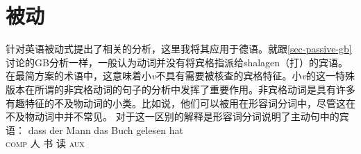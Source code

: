\section{被动}

\addlines
\citet{Adger2003a}针对英语被动式提出了相关的分析，这里我将其应用于德语。就跟\ref{sec-passive-gb}讨论的GB分析一样，一般认为动词并没有将宾格指派给shalagen（打）的宾语。在最简方案的术语中，这意味着小\emph{v}不具有需要被核查的宾格特征。小\emph{v}的这一特殊版本在所谓的非宾格动词的句子的分析中发挥了重要作用\citep{Perlmutter78}。非宾格动词是具有许多有趣特征的不及物动词的小类。比如说，他们可以被用在形容词分词中，尽管这在不及物动词中并不常见。
\eal
{}
\zl
对于这一区别的解释是形容词分词说明了主动句中的宾语：
\eal
\ex
\gll dass der Mann das Buch gelesen hat\\
     \textsc{comp}  人   书 读 \textsc{aux}\\
